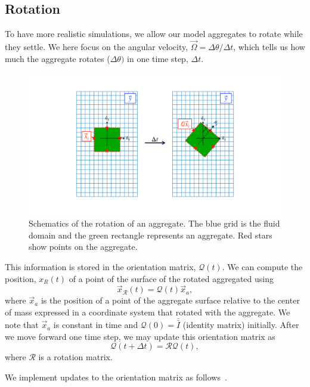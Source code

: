 \subsection{Rotation}
To have more realistic simulations, we allow our model aggregates to rotate while they settle.
We here focus on the angular velocity, $\vec{\Omega} = \Delta \theta / \Delta t$, which tells us how much the aggregate rotates ($\Delta \theta)$ in one time step, $\Delta t$. 
\begin{figure}[ht]
	\begin{center}
		\includegraphics[scale=0.25]{./figures/fig_rotation_schematics.pdf}
	\caption{Schematics of the rotation of an aggregate. The blue grid is the fluid domain and the green rectangle represents an aggregate. Red stars show points on the aggregate.}
	\label{fig_rotation_schematics}
\end{center}
\end{figure}
This information is stored in the orientation matrix, $\mathcal{Q}(t)$. 
We can compute the position, $x_R(t)$ of a point of the surface of the rotated aggregated using
\[
\vec{x}_{\mathcal{R}}(t) = \mathcal{Q}(t) \vec{x}_a,
\]
where $\vec{x}_a $ is the position of a point of the aggregate surface relative to the center of mass expressed in a coordinate system that rotated with the aggregate. We note that $\vec{x}_a$ is constant in time and $\mathcal{Q}(0) = \bar{\bar{I}}$ (identity matrix) initially. After we move forward one time step, we may update this orientation matrix as 
\begin{equation}
	\mathcal{Q}(t + \Delta t) = \mathcal{R} \mathcal{Q}(t),
\end{equation} 
where $\mathcal{R}$ is a rotation matrix. 
\par
We implement updates to the orientation matrix as follows~\cite{polimeno_toward_2022}.
